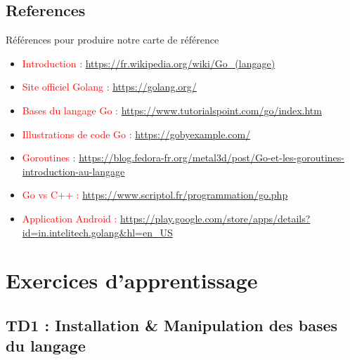 \documentclass{beamer}
\begin{document}
\subsection{References}

\begin{frame}
\begin{block}{Références pour produire notre carte de référence} 
	\begin{itemize}
		[circle]
		\item \textcolor{red}{Introduction :} \footnotesize \url{https://fr.wikipedia.org/wiki/Go_(langage)} \normalsize
		\item \textcolor{red}{Site officiel Golang :} \footnotesize \url{https://golang.org/} \normalsize
		\item \textcolor{red}{Bases du langage Go :} \footnotesize \url{https://www.tutorialspoint.com/go/index.htm} \normalsize
		\item \textcolor{red}{Illustrations de code Go :} \footnotesize \url{https://gobyexample.com/} \normalsize
		\item \textcolor{red}{Goroutines :} \footnotesize \url{https://blog.fedora-fr.org/metal3d/post/Go-et-les-goroutines-introduction-au-langage} \normalsize
		\item \textcolor{red}{Go vs C++ :} \footnotesize \url{https://www.scriptol.fr/programmation/go.php} \normalsize
		\item \textcolor{red}{Application Android :} \footnotesize \url{https://play.google.com/store/apps/details?id=in.intelitech.golang&hl=en_US} \normalsize
	\end{itemize}
\end{block}
\end{frame}

\section{Exercices d'apprentissage}

\subsection{TD1 : Installation \& Manipulation des bases du langage}
\end{document}
